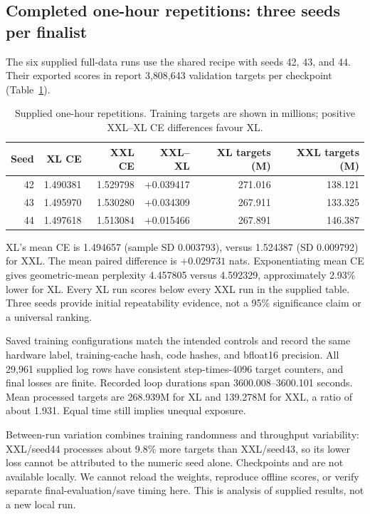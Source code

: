 \documentclass[12pt]{article}
\begin{document}
\subsection{Completed one-hour repetitions: three seeds per finalist}
The six supplied full-data runs use the shared recipe with seeds 42, 43, and 44.
Their exported scores in 
report 3{,}808{,}643 validation targets per checkpoint (Table~\ref{tab:seeds}).

\begin{table}[htbp]
\centering
\small
\caption{Supplied one-hour repetitions. Training targets are shown in millions;
positive XXL--XL CE differences favour XL.}
\label{tab:seeds}
\begin{tabular}{rrrrrr}
\toprule
Seed & XL CE & XXL CE & XXL--XL & XL targets (M) & XXL targets (M) \\
\midrule
42 & 1.490381 & 1.529798 & +0.039417 & 271.016 & 138.121 \\
43 & 1.495970 & 1.530280 & +0.034309 & 267.911 & 133.325 \\
44 & 1.497618 & 1.513084 & +0.015466 & 267.891 & 146.387 \\
\bottomrule
\end{tabular}
\end{table}

XL's mean CE is 1.494657 (sample SD 0.003793), versus 1.524387 (SD 0.009792) for
XXL. The mean paired difference is $+0.029731$ nats. Exponentiating mean CE gives
geometric-mean perplexity 4.457805 versus 4.592329, approximately 2.93\% lower for
XL. Every XL run scores below every XXL run in the supplied table. Three seeds
provide initial repeatability evidence, not a 95\% significance claim or a universal
ranking.

Saved training configurations match the intended controls and record the same
hardware label, training-cache hash, code hashes, and bfloat16 precision. All
29{,}961 supplied log rows have consistent step-times-4096 target counters, and
final losses are finite. Recorded loop durations span 3600.008--3600.101 seconds.
Mean processed targets are 268.939M for XL and 139.278M for XXL, a ratio of about
1.931. Equal time still implies unequal exposure.

Between-run variation combines training randomness and throughput variability:
XXL/seed44 processes about 9.8\% more targets than XXL/seed43, so its lower loss
cannot be attributed to the numeric seed alone. Checkpoints and
 are not available locally. We cannot reload the
weights, reproduce offline scores, or verify separate final-evaluation/save timing
here. This is analysis of supplied results, not a new local run.
\end{document}
